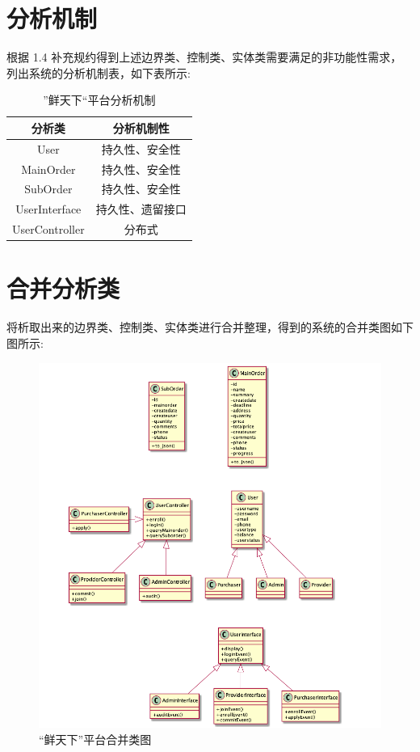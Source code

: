 
\section{分析机制} 
	根据 1.4 补充规约得到上述边界类、控制类、实体类需要满足的非功能性需求， 列出系统的分析机制表，如下表所示:\\
	\newline

	\begin{table}
		\centering
		\caption{”鲜天下“平台分析机制}
		\begin{tabular}{|c|c|}
			\hline  
				分析类 & 分析机制性\\
			\hline  
				User & 持久性、安全性\\
			\hline  
				MainOrder & 持久性、安全性\\
			\hline
				SubOrder & 持久性、安全性\\
			\hline  
				UserInterface & 持久性、遗留接口\\
			\hline
				UserController & 分布式\\
			\hline
		\end{tabular}
	\end{table}



\section{合并分析类}
	将析取出来的边界类、控制类、实体类进行合并整理，得到的系统的合并类图如下图所示:\\
	\begin{figure}[htp]
		    \centering
		    \includegraphics[width=18cm]{misc/figure_src/class_system.png}
		    \caption{“鲜天下”平台合并类图}
		\end{figure}
